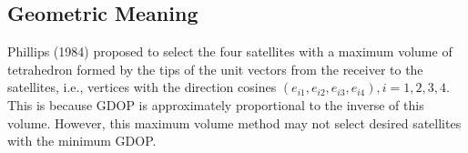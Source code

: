 \documentclass[a4paper]{report}
\begin{document}
\subsection{Geometric Meaning}
Phillips (1984) proposed to select the four satellites with a
maximum volume of tetrahedron formed by the tips of the
unit vectors from the receiver to the satellites, i.e., vertices
with the direction cosines $(e_{i1}, e_{i2}, e_{i3}, e_{i4}), i = 1, 2, 3, 4$. This
is because GDOP is approximately proportional to the inverse of this volume. However, this maximum volume method may not select desired satellites with the minimum GDOP. 
\end{document}
